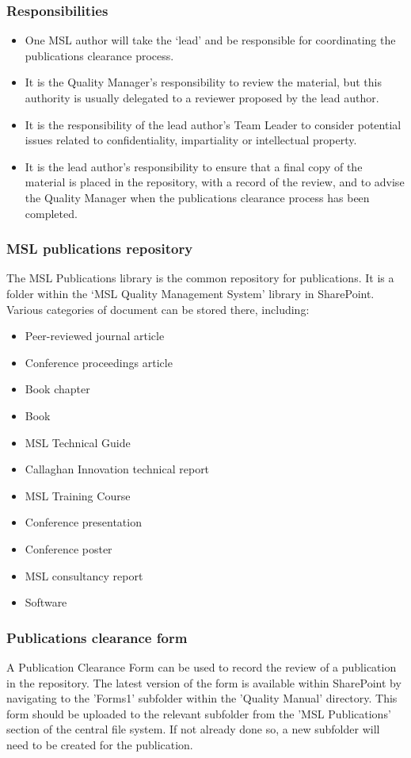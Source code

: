\subsubsection{Responsibilities}
\begin{itemize}
\item  One MSL author will take the `lead' and be responsible for coordinating the publications clearance process.
\item  It is the Quality Manager's responsibility to review the material, but this authority is usually delegated to a reviewer proposed by the lead author.
\item  It is the responsibility of the lead author's Team Leader to consider potential issues related to confidentiality, impartiality or intellectual property.
\item  It is the lead author's responsibility to ensure that a final copy of the material is placed in the repository, with a record of the review, and to advise the Quality Manager when the publications clearance process has been completed.
\end{itemize}

\subsubsection{MSL publications repository}
 \label{sss:publications_repository}
The MSL Publications library is the common repository for publications. It is a folder within the `MSL Quality Management System' library in SharePoint. Various categories of document can be stored there, including: 
\begin{itemize}
 \item Peer-reviewed journal article
 \item Conference proceedings article 
 \item Book chapter
 \item Book
 \item MSL Technical Guide
 \item Callaghan Innovation technical report 
 \item MSL Training Course 
 \item Conference presentation 
 \item Conference poster
 \item MSL consultancy report
 \item Software
\end{itemize}

\subsubsection{Publications clearance form}
A Publication Clearance Form can be used to record the review of a publication in the repository. The latest version of the form is available within SharePoint by navigating to the 'Forms1' subfolder within the 'Quality Manual' directory.  This form should be uploaded to the relevant subfolder from the 'MSL Publications' section of the central file system.  If not already done so, a new subfolder will need to be created for the publication.

